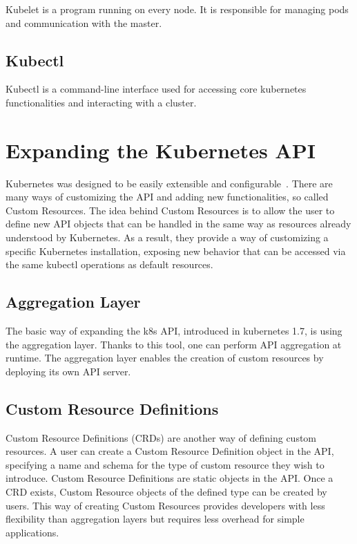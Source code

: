 Kubelet is a program running on every node. It is responsible for managing pods
and communication with the master.

\subsection{Kubectl}
Kubectl is a command-line interface used for accessing core kubernetes
functionalities and interacting with a cluster.

\section{Expanding the Kubernetes API}
Kubernetes was designed to be easily extensible and
configurable~\cite{extending-kubeapi}. There are many ways of customizing the
API and adding new functionalities, so called Custom Resources. The idea behind
Custom Resources is to allow the user to define new API objects that can be
handled in the same way as resources already understood by Kubernetes. As
a result, they provide a way of customizing a specific Kubernetes installation,
exposing new behavior that can be accessed via the same kubectl operations as
default resources.

\subsection{Aggregation Layer}
The basic way of expanding the k8s API, introduced in kubernetes 1.7, is using
the aggregation layer. Thanks to this tool, one can perform API aggregation at
runtime. The aggregation layer enables the creation of custom resources by
deploying its own API server.

\subsection{Custom Resource Definitions}
Custom Resource Definitions (CRDs) are another way of defining custom resources.
A user can create a Custom Resource Definition object in the API, specifying
a name and schema for the type of custom resource they wish to introduce.
Custom Resource Definitions are static objects in the API. Once a CRD exists,
Custom Resource objects of the defined type can be created by users. This way
of creating Custom Resources provides developers with less flexibility than
aggregation layers but requires less overhead for simple applications.
